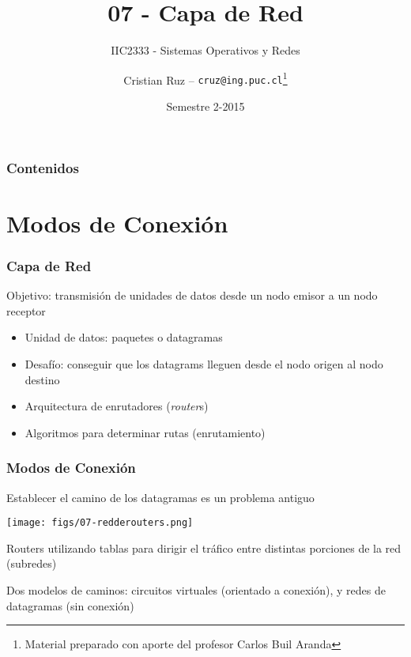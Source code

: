 \documentclass[letter]{beamer}
\title[IIC2333] %
{07 - Capa de Red}
\subtitle{IIC2333 - Sistemas Operativos y Redes}
\author[C.Ruz] %
{Cristian Ruz -- {\tt cruz@ing.puc.cl}\footnote{Material preparado con aporte del profesor Carlos Buil Aranda} }
\institute[PUC] %
{
  Departamento de Ciencia de la Computación\\
  Pontificia Universidad Católica de Chile
}
\date[2/2015] %
{Semestre 2-2015}
\begin{document}
\frame{\titlepage}


\begin{frame}
\frametitle{Contenidos}
\tableofcontents
\end{frame}


\section{Modos de Conexión}

\begin{frame}
  \frametitle{Capa de Red}
  
  Objetivo: transmisión de unidades de datos desde un nodo emisor
  a un nodo receptor
  
  \begin{itemize}
    \item Unidad de datos: paquetes o datagramas
    \item Desafío: conseguir que los datagrams lleguen desde el nodo origen
          al nodo destino
    \item Arquitectura de enrutadores ({\em router}s)
    \item Algoritmos para determinar rutas (enrutamiento)
  \end{itemize}
  
\end{frame}
\begin{frame}
  \frametitle{Modos de Conexión}
  
  Establecer el camino de los datagramas es un problema antiguo

  \begin{center}
    \texttt{[image: figs/07-redderouters.png]}
  \end{center}
  
  Routers utilizando tablas para dirigir el tráfico entre distintas
  porciones de la red (subredes)

  Dos modelos de caminos: circuitos virtuales (orientado a conexión),
  y redes de datagramas (sin conexión)
\end{frame}
\end{document}
